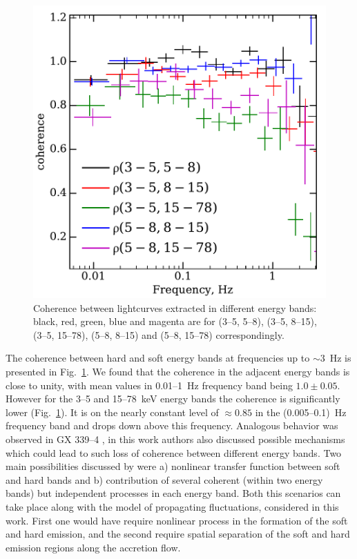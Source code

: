 \documentclass[a4paper,fleqn,usenatbib]{mnras}
\begin{document}
\begin{figure}
    \includegraphics[width=\columnwidth]{coherence_5.pdf}
    \caption{Coherence between lightcurves extracted in different energy bands: black, red, green, blue and magenta are for (3--5, 5--8), (3--5, 8--15), (3--5, 15--78), (5--8, 8--15) and (5--8, 15--78) correspondingly.}
    \label{fig:coherence}
\end{figure}

The coherence between hard and soft energy bands at frequencies up to $\sim3$~Hz is presented in Fig.~\ref{fig:coherence}. 
We found that the coherence in the adjacent energy bands is close to unity, with mean values in 0.01--1~Hz frequency band being $1.0\pm0.05$.
However for the 3--5 and 15--78~keV energy bands the coherence is significantly lower (Fig.~\ref{fig:coherence}). 
It is on the nearly constant level of $\approx0.85$ in the (0.005--0.1)~Hz frequency band and drops down above this frequency.
Analogous behavior was observed in GX 339--4 , in this work authors also discussed possible mechanisms which could lead to such loss of coherence between different energy bands. 
Two main possibilities discussed by  were a) nonlinear transfer function between soft and hard bands and b) contribution of several coherent (within two energy bands) but independent processes in each energy band.
Both this scenarios can take place along with the model of propagating fluctuations, considered in this work.
First one would have require nonlinear process in the formation of the soft and hard emission, and the second require spatial separation of the soft and hard emission regions along the accretion flow. 
\end{document}
